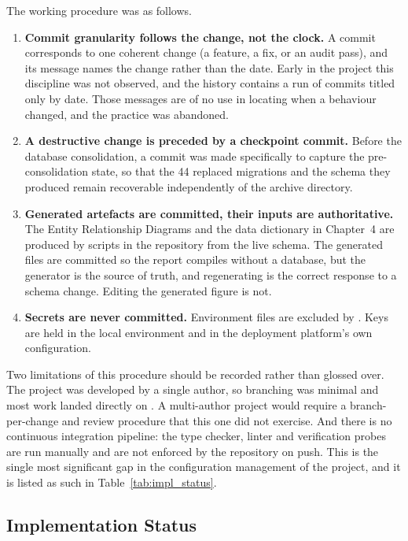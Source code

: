 \documentclass[12pt, oneside]{article} %
\newcommand{\tcode}[1]{\path{#1}}
\begin{document}
The working procedure was as follows.

\begin{enumerate}
    \item \textbf{Commit granularity follows the change, not the clock.} A commit corresponds to one coherent change (a feature, a fix, or an audit pass), and its message names the change rather than the date. Early in the project this discipline was not observed, and the history contains a run of commits titled only by date. Those messages are of no use in locating when a behaviour changed, and the practice was abandoned.
    \item \textbf{A destructive change is preceded by a checkpoint commit.} Before the database consolidation, a commit was made specifically to capture the pre-consolidation state, so that the 44 replaced migrations and the schema they produced remain recoverable independently of the archive directory.
    \item \textbf{Generated artefacts are committed, their inputs are authoritative.} The Entity Relationship Diagrams and the data dictionary in Chapter~4 are produced by scripts in the repository from the live schema. The generated files are committed so the report compiles without a database, but the generator is the source of truth, and regenerating is the correct response to a schema change. Editing the generated figure is not.
    \item \textbf{Secrets are never committed.} Environment files are excluded by \tcode{.gitignore}. Keys are held in the local environment and in the deployment platform's own configuration.
\end{enumerate}

Two limitations of this procedure should be recorded rather than glossed over. The project was developed by a single author, so branching was minimal and most work landed directly on \tcode{main}. A multi-author project would require a branch-per-change and review procedure that this one did not exercise. And there is no continuous integration pipeline: the type checker, linter and verification probes are run manually and are not enforced by the repository on push. This is the single most significant gap in the configuration management of the project, and it is listed as such in Table~\ref{tab:impl_status}.

\subsection{Implementation Status}
\label{sec:impl-status}
\end{document}
